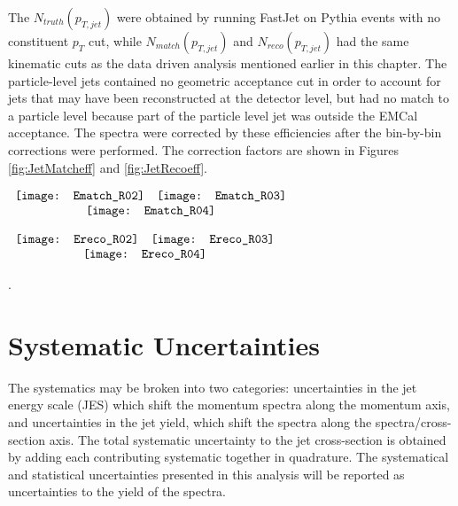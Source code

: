 The $N_{truth} (p_{T, jet})$ were obtained by running FastJet on Pythia events with no constituent $p_{T}$ cut, while $N_{match}(p_{T, jet})$ and $N_{reco} (p_{T, jet})$ had the same kinematic cuts as the data driven analysis mentioned earlier in this chapter.  The particle-level jets contained no geometric acceptance cut in order to account for jets that may have been reconstructed at the detector level, but had no match to a particle level because part of the particle level jet was outside the EMCal acceptance.  The spectra were corrected by these efficiencies after the bin-by-bin corrections were performed.  The correction factors are shown in Figures \ref{fig:JetMatcheff} and \ref{fig:JetRecoeff}.

\begin{figure*}[t!]
$\begin{array}{rl}
    \texttt{[image: Ematch\_R02]} &
    \texttt{[image: Ematch\_R03]}\\
    \multicolumn{2}{c}{\texttt{[image: Ematch\_R04]}}
\end{array}$
\caption[Jet reconstruction efficiency for jets between R = 0.2 and R = 0.4. ]{\label{fig:JetMatcheff}Jet matching efficiency for jets between R = 0.2 and R = 0.4.}
\end{figure*}

\begin{figure*}[t!]
$\begin{array}{rl}
    \texttt{[image: Ereco\_R02]} &
    \texttt{[image: Ereco\_R03]}\\
    \multicolumn{2}{c}{\texttt{[image: Ereco\_R04]}}
\end{array}$
\caption[Jet reconstruction efficiency for jets between R = 0.2 and R = 0.4.]{\label{fig:JetRecoeff}Jet reconstruction efficiency for jets between R = 0.2 and R = 0.4}
\end{figure*}


.

\section{Systematic Uncertainties}

The systematics may be broken into two categories: uncertainties in the jet energy scale (JES) which shift the momentum spectra along the momentum axis, and uncertainties in the jet yield, which shift the spectra along the spectra/cross-section axis.  The total systematic uncertainty to the jet cross-section is obtained by adding each contributing systematic together in quadrature.  The systematical and statistical uncertainties presented in this analysis will be reported as uncertainties to the yield of the spectra.  

